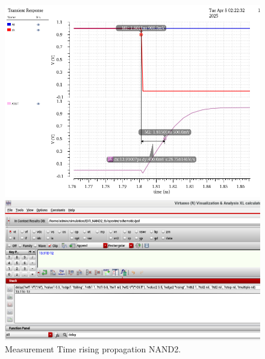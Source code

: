\begin{figure}[H]
	\begin{minipage}{0.5\linewidth}
		\includegraphics[width=\linewidth]{section/EX1/NAND/EX1_NAND2_Tpdr_Waveform.png}
	\end{minipage}
	\begin{minipage}{0.5\linewidth}
		\includegraphics[width=\linewidth]{section/EX1/NAND/EX1_NAND2_Tpdr_Cal.png}
	\end{minipage}
	\caption{Measurement Time rising propagation NAND2.}
\end{figure}


